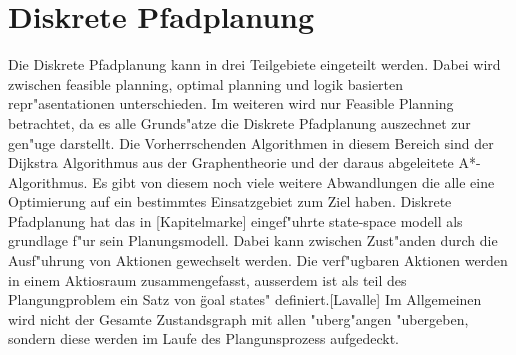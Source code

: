 \section{Diskrete Pfadplanung}
Die Diskrete Pfadplanung kann in drei Teilgebiete eingeteilt werden. Dabei wird zwischen feasible planning, optimal planning und logik basierten repr"asentationen unterschieden. Im weiteren wird nur Feasible Planning betrachtet, da es alle Grunds"atze die Diskrete Pfadplanung auszechnet zur gen"uge darstellt.  
Die Vorherrschenden Algorithmen in diesem Bereich sind der Dijkstra Algorithmus aus der Graphentheorie und der daraus abgeleitete A*-Algorithmus. Es gibt von diesem noch viele weitere Abwandlungen die alle eine Optimierung auf ein bestimmtes Einsatzgebiet zum Ziel haben. 
\newline
Diskrete Pfadplanung hat das in [Kapitelmarke] eingef"uhrte state-space modell als grundlage f"ur sein Planungsmodell. Dabei kann zwischen Zust"anden durch die Ausf"uhrung von Aktionen gewechselt werden. Die verf"ugbaren Aktionen werden in einem Aktiosraum zusammengefasst, ausserdem ist als teil des Plangungproblem ein Satz von \"goal states" definiert.[Lavalle]
Im Allgemeinen wird nicht der Gesamte Zustandsgraph mit allen "uberg"angen "ubergeben, sondern diese werden im Laufe des Plangunsprozess aufgedeckt.

